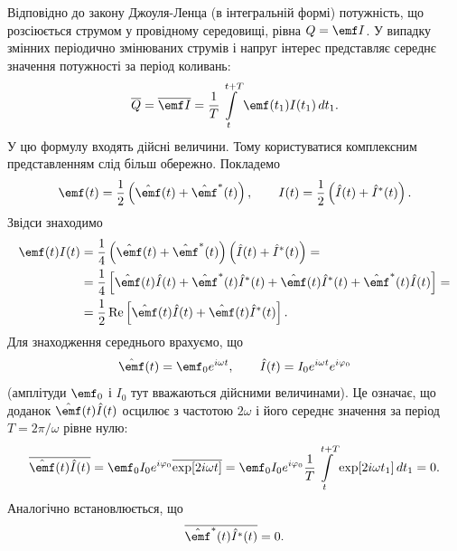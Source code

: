 Відповідно до закону Джоуля-Ленца (в інтегральній формі)
потужність, що розсіюється струмом у провідному середовищі, рівна $Q = \emf I$. У
випадку змінних періодично змінюваних струмів і напруг
інтерес представляє середнє значення потужності за період коливань:
\begin{equation}\label{eq:average_power}
	\overline{Q} = \overline{\emf I} = \frac{1}{T}\int\limits_{t}^{t+T} \emf(t_1)I(t_1) \, dt_1.
\end{equation}
У цю формулу входять дійсні величини. Тому користуватися
комплексним представленням слід більш обережно. Покладемо
\begin{equation}\label{eq:real_parts}
	\emf(t) = \frac{1}{2}\left(\hat{\emf}(t) + \hat{\emf}^*(t)\right), \qquad
	I(t) = \frac{1}{2}\left(\hat{I}(t) + \hat{I}^*(t)\right).
\end{equation}
Звідси знаходимо
\begin{equation}\label{eq:product_expansion}
	\begin{aligned}
		\emf(t)I(t) & = \frac{1}{4}\left(\hat{\emf}(t) + \hat{\emf}^*(t)\right)\left(\hat{I}(t) + \hat{I}^*(t)\right) =                                         \\
		            & = \frac{1}{4}\left[\hat{\emf}(t)\hat{I}(t) + \hat{\emf}^*(t)\hat{I}^*(t) + \hat{\emf}(t)\hat{I}^*(t) + \hat{\emf}^*(t)\hat{I}(t)\right] = \\
		            & = \frac{1}{2}\operatorname{Re}\left[\hat{\emf}(t)\hat{I}(t) + \hat{\emf}(t)\hat{I}^*(t)\right].
	\end{aligned}
\end{equation}
Для знаходження середнього врахуємо, що
\begin{equation}\label{eq:complex_amplitudes_time}
	\hat{\emf}(t) = \emf_0 e^{i\omega t}, \qquad
	\hat{I}(t) = I_0 e^{i\omega t} e^{i\varphi_0}
\end{equation}
(амплітуди $\emf_0$ і $I_0$ тут вважаються дійсними величинами). Це
означає, що доданок $\hat{\emf}(t)\hat{I}(t)$ осцилює з частотою $2\omega$ і його середнє
значення за період $T = 2\pi/\omega$ рівне нулю:
\begin{equation}\label{eq:fast_oscillating_term}
	\overline{\hat{\emf}(t)\hat{I}(t)} = \emf_0 I_0 e^{i\varphi_0} \overline{\exp[2i\omega t]}
	= \emf_0 I_0 e^{i\varphi_0} \frac{1}{T}\int\limits_{t}^{t+T} \exp[2i\omega t_1] \, dt_1 = 0.
\end{equation}
Аналогічно встановлюється, що
\begin{equation}\label{eq:conjugate_term}
	\overline{\hat{\emf}^*(t)\hat{I}^*(t)} = 0.
\end{equation}
